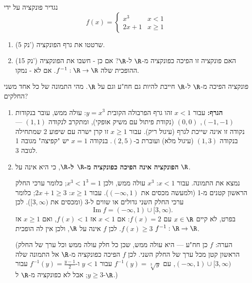 
\begin{question}
נגדיר פונקציה על ידי
\[
f(x)=\begin{cases}
x^3 & x<1\\
2x+1 & x\ge 1
\end{cases}
\]
\begin{enumerate}
  \item (5 נק') שרטטו את גרף הפונקציה.
  \item (15 נק') האם פונקציה זו הפיכה כפונקציה מ-$\R$ ל-$\R$?
  אם כן - חשבו את הפונקציה ההופכית שלה $f^{-1}:\R\to\R$.
  אם לא - נמקו.
\end{enumerate}
\end{question}

\begin{hint}
פונקציה הפיכה מ-$\R$ ל-$\R$ חייבת להיות גם חח"ע וגם על $\R$. מהי התמונה של כל אחד משני החלקים?
\end{hint}

\begin{solution}
\begin{enumerate}
  \item \textbf{הגרף:} עבור $x<1$ זהו גרף הפרבולה הקובית $y=x^3$: עולה ממש, עובר בנקודות $(-1,-1)$, $(0,0)$ (נקודת פיתול עם משיק אופקי), ומתקרב לנקודה $(1,1)$ — נקודה זו \emph{אינה} שייכת לגרף (עיגול ריק). עבור $x\ge1$ זו קרן ישרה עם שיפוע 2 שמתחילה בנקודה $(1,3)$ (עיגול מלא) ועוברת ב-$(2,5)$. בנקודה $x=1$ יש "קפיצה" מגובה 1 לגובה 3.
  \item \textbf{הפונקציה אינה הפיכה כפונקציה מ-$\R$ ל-$\R$}, כי היא אינה על $\R$.

  נמצא את התמונה. עבור $x<1$: $x^3$ עולה ממש, ולכן $x^3<1^3=1$; כלומר ערכי החלק הראשון קטנים מ-1 (ולמעשה מכסים את $(-\infty,1)$). עבור $x\ge1$: $2x+1\ge3$; כלומר ערכי החלק השני גדולים או שווים ל-3 (ומכסים את $[3,\infty)$). לכן
  \[
  \operatorname{Im}f=(-\infty,1)\cup[3,\infty).
  \]
  בפרט, לא קיים $x\in\R$ עם $f(x)=2$: אם $x<1$ אז $f(x)<1$, ואם $x\ge1$ אז $f(x)\ge3$. לכן $f$ אינה על $\R$, ולכן אין לה הופכית $f^{-1}:\R\to\R$.

  (הערה: $f$ כן חח"ע — היא עולה ממש, שכן כל חלק עולה ממש וכל ערך של החלק הראשון קטן מכל ערך של החלק השני. לכן $f$ הפיכה כפונקציה מ-$\R$ אל התמונה שלה $(-\infty,1)\cup[3,\infty)$, עם $f^{-1}(y)=\sqrt[3]{y}$ עבור $y<1$ ו-$f^{-1}(y)=\frac{y-1}{2}$ עבור $y\ge3$; אבל לא כפונקציה מ-$\R$ ל-$\R$.)
\end{enumerate}
\end{solution}
